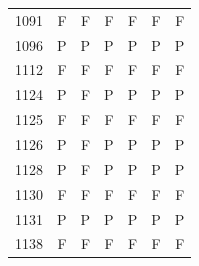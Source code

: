 \begin{table}[!htbp]
\begin{tabular*}{\textwidth}{@{\extracolsep{\fill}}rrrrrrr}
1091 & F & F & F & F & F & F\\
1096 & P & P & P & P & P & P\\
1112 & F & F & F & F & F & F\\
1124 & P & F & P & P & P & P\\
1125 & F & F & F & F & F & F\\
1126 & P & F & P & P & P & P\\
1128 & P & F & P & P & P & P\\
1130 & F & F & F & F & F & F\\
1131 & P & P & P & P & P & P\\
1138 & F & F & F & F & F & F\\
\bottomrule\end{tabular*}\end{table}
\clearpage
